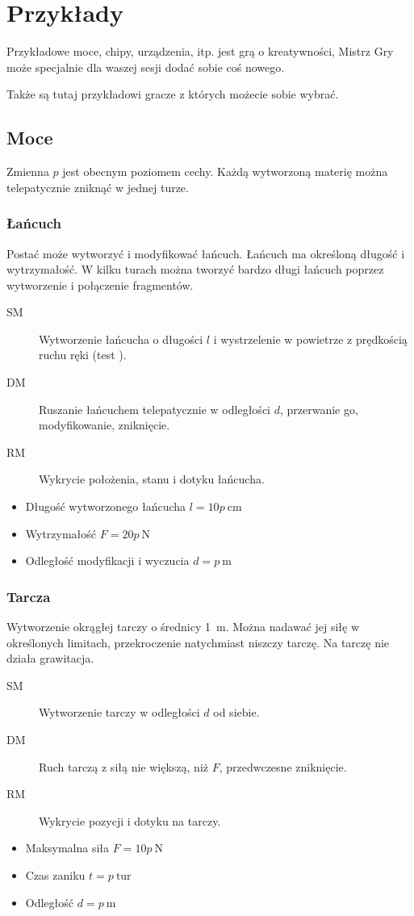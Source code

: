 \chapter{Przykłady}
Przykładowe moce, chipy, urządzenia, itp.
\kosmoramus{} jest grą o kreatywności, Mistrz Gry może specjalnie dla waszej sesji dodać sobie coś nowego.

Także są tutaj przykładowi gracze z których możecie sobie wybrać.

\section{Moce}
Zmienna $p$ jest obecnym poziomem cechy.
Każdą wytworzoną materię można telepatycznie zniknąć w jednej turze.

\subsection{Łańcuch}
Postać może wytworzyć i modyfikować łańcuch.
Łańcuch ma określoną długość i wytrzymałość.
W kilku turach można tworzyć bardzo długi łańcuch poprzez wytworzenie i połączenie fragmentów.
\begin{description}
	\item[SM] Wytworzenie łańcucha o długości $l$ i wystrzelenie w powietrze z prędkością ruchu ręki (test \aba{}).
	\item[DM] Ruszanie łańcuchem telepatycznie w odległości $d$, przerwanie go, modyfikowanie, zniknięcie.
	\item[RM] Wykrycie położenia, stanu i dotyku łańcucha.
\end{description}
\begin{itemize}
	\item Długość wytworzonego łańcucha $l = 10p \ \si{\centi\metre}$
	\item Wytrzymałość $F = 20p \ \si{\newton}$
	\item Odległość modyfikacji i wyczucia $d = p \ \si{\metre}$
\end{itemize}

\subsection{Tarcza}
Wytworzenie okrągłej tarczy o średnicy \SI{1}{\metre}.
Można nadawać jej siłę w określonych limitach, przekroczenie natychmiast niszczy tarczę.
Na tarczę nie działa grawitacja.
\begin{description}
	\item[SM] Wytworzenie tarczy w odległości $d$ od siebie.
	\item[DM] Ruch tarczą z siłą nie większą, niż $F$, przedwczesne zniknięcie.
	\item[RM] Wykrycie pozycji i dotyku na tarczy.
\end{description}
\begin{itemize}
	\item Maksymalna siła $F = 10p \ \si{\newton}$
	\item Czas zaniku $t = p \ \text{tur}$
	\item Odległość $d = p \ \si{\metre}$
\end{itemize}

